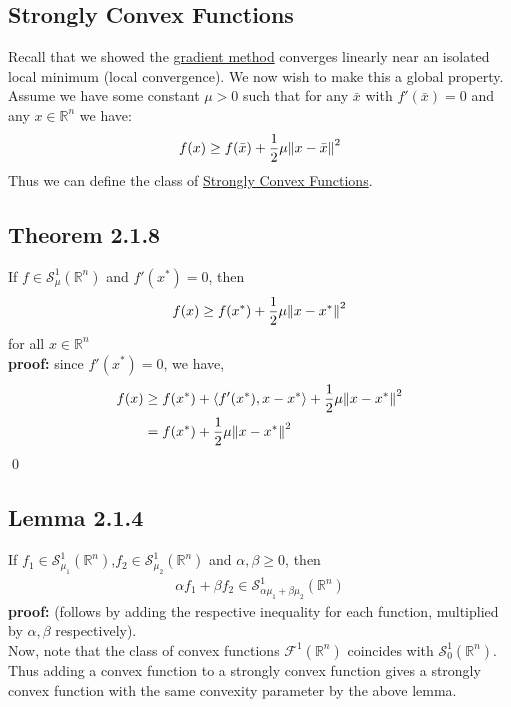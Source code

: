 \documentclass[12pt,a4paper]{article}
\begin{document}
	 \subsection*{Strongly Convex Functions}\label{subsec:SCF}
	 Recall that we showed the \hyperref[thm124]{gradient method} converges linearly near an isolated local minimum (local convergence). We now wish to make this a global property. \\
	 Assume we have some constant $\mu > 0$ such that for any $\bar{x}$ with $f'(\bar{x})=0$ and any $x \in \mathbb{R}^n$ we have:
	 \begin{align*}
	 	f(x) \geq f(\bar{x}) + \frac{1}{2}\mu \norm{x - \bar{x}}^2
	 \end{align*}
	 Thus we can define the class of \hyperref[sec:Def]{Strongly Convex Functions}.
	 \subsection*{Theorem 2.1.8}\label{thm218}
	 If $f \in \mathcal{S}_\mu^1(\mathbb{R}^n)$ and $f'(x^*) = 0$, then
	 \begin{align*}
	 	f(x) \geq f(x^*) + \frac{1}{2}\mu \norm{x - x^*}^2
	 \end{align*}
	 for all $x \in \mathbb{R}^n$ \\
	 \textbf{proof:} since $f'(x^*) = 0$, we have,
	 \begin{align*}
	 	f(x) &\geq f(x^*) + \langle f'(x^*), x - x^*\rangle + \frac{1}{2}\mu \norm{x - x^*}^2 \\
	 	&= f(x^*) + \frac{1}{2}\mu \norm{x - x^*}^2
	 \end{align*}
	 \qed \\
	 \subsection*{Lemma 2.1.4}\label{lem214}
	 If $f_1 \in \mathcal{S}_{\mu_1}^1(\mathbb{R}^n)$,$f_2 \in \mathcal{S}_{\mu_2}^{1}(\mathbb{R}^n)$ and $\alpha, \beta \geq 0$, then
	 \begin{align*}
	 	\alpha f_1 + \beta f_2 \in \mathcal{S}_{\alpha\mu_1 + \beta \mu_2}^{1}(\mathbb{R}^n)
	 \end{align*}
	 \textbf{proof:} (follows by adding the respective inequality for each function, multiplied by $\alpha, \beta$ respectively). \\
	 Now, note that the class of convex functions $\mathcal{F}^1(\mathbb{R}^n)$ coincides with $\mathcal{S}_{0}^{1}(\mathbb{R}^n)$. Thus adding a convex function to a strongly convex function gives a strongly convex function with the same convexity parameter by the above lemma. 
\end{document}
